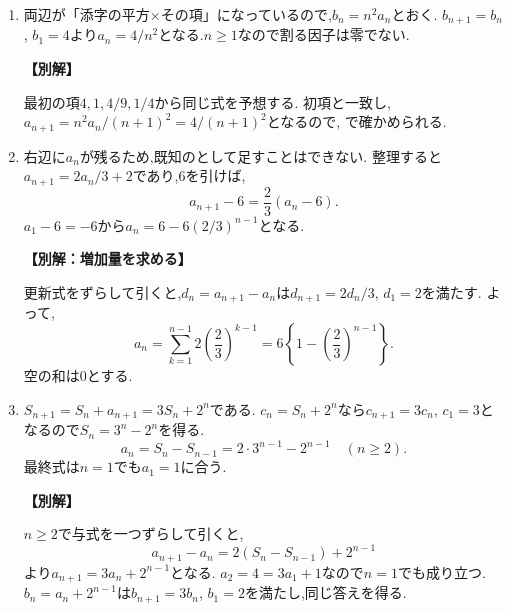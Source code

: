 \begin{enumerate}[label=\textbf{問\arabic*.},leftmargin=3.8em,format=\bookitemlink{practice-basic}{solution}{problem}]
          \item 両辺が「添字の平方×その項」になっているので,$b_n=n^2a_n$とおく.
                  $b_{n+1}=b_n$, $b_1=4$より$a_n=4/n^2$となる.$n\ge1$なので割る因子は零でない.
                  \par\smallskip\noindent\textbf{【別解】}\par
                  最初の項$4,1,4/9,1/4$から同じ式を予想する.
                  初項と一致し,$a_{n+1}=n^2a_n/(n+1)^2=4/(n+1)^2$となるので,
                  で確かめられる.

          \item 右辺に$a_n$が残るため,既知のとして足すことはできない.
                  整理すると$a_{n+1}=2a_n/3+2$であり,$6$を引けば,
                  \[
                    a_{n+1}-6=\frac23(a_n-6).
                  \]
                  $a_1-6=-6$から$a_n=6-6(2/3)^{n-1}$となる.
                  \par\smallskip\noindent\textbf{【別解：増加量を求める】}\par
                  更新式をずらして引くと,$d_n=a_{n+1}-a_n$は$d_{n+1}=2d_n/3$, $d_1=2$を満たす.
                  よって,
                  \[
                    a_n=\sum_{k=1}^{n-1}2\left(\frac23\right)^{k-1}
                       =6\left\{1-\left(\frac23\right)^{n-1}\right\}.
                  \]
                  空の和は$0$とする.

          \item $S_{n+1}=S_n+a_{n+1}=3S_n+2^n$である.
                  $c_n=S_n+2^n$なら$c_{n+1}=3c_n$, $c_1=3$となるので$S_n=3^n-2^n$を得る.
                  \[
                    a_n=S_n-S_{n-1}=2\cdot3^{n-1}-2^{n-1}
                    \quad(n\ge2).
                  \]
                  最終式は$n=1$でも$a_1=1$に合う.
                  \par\smallskip\noindent\textbf{【別解】}\par
                  $n\ge2$で与式を一つずらして引くと,
                  \[
                    a_{n+1}-a_n=2(S_n-S_{n-1})+2^{n-1}
                  \]
                  より$a_{n+1}=3a_n+2^{n-1}$となる.
                  $a_2=4=3a_1+1$なので$n=1$でも成り立つ.
                  $b_n=a_n+2^{n-1}$は$b_{n+1}=3b_n$, $b_1=2$を満たし,同じ答えを得る.


\end{enumerate}

